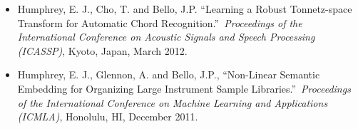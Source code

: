 \begin{itemize}
\item Humphrey, E. J., Cho, T. and Bello, J.P. ``Learning a Robust Tonnetz-space Transform for Automatic Chord Recognition.''~{\it Proceedings of the International Conference on Acoustic Signals and Speech Processing (ICASSP)}, Kyoto, Japan, March 2012.

\item Humphrey, E. J., Glennon, A. and Bello, J.P., ``Non-Linear Semantic Embedding for Organizing Large Instrument Sample Libraries.''~{\it Proceedings of the International Conference on Machine Learning and Applications (ICMLA)}, Honolulu, HI, December 2011.

\end{itemize}

